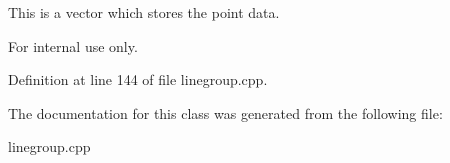 This is a vector which stores the point data. 

\begin{DoxyInternal}{For internal use only.}
\end{DoxyInternal}


Definition at line 144 of file linegroup.cpp.



The documentation for this class was generated from the following file:\begin{DoxyCompactItemize}
\item 
linegroup.cpp\end{DoxyCompactItemize}
